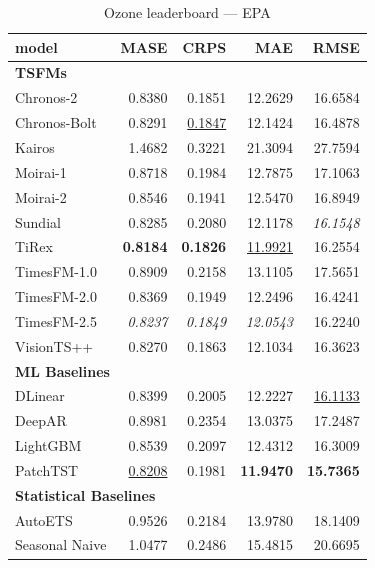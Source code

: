 \begin{table}[H]
\caption{Ozone leaderboard --- EPA}
\centering
\begin{small}
\begin{tabular}{lrrrr}
\toprule
model & MASE & CRPS & MAE & RMSE \\
\midrule
\multicolumn{5}{l}{\textbf{TSFMs}} \\
Chronos-2 & 0.8380 & 0.1851 & 12.2629 & 16.6584 \\
Chronos-Bolt & 0.8291 & \underline{0.1847} & 12.1424 & 16.4878 \\
Kairos & 1.4682 & 0.3221 & 21.3094 & 27.7594 \\
Moirai-1 & 0.8718 & 0.1984 & 12.7875 & 17.1063 \\
Moirai-2 & 0.8546 & 0.1941 & 12.5470 & 16.8949 \\
Sundial & 0.8285 & 0.2080 & 12.1178 & \textit{16.1548} \\
TiRex & \textbf{0.8184} & \textbf{0.1826} & \underline{11.9921} & 16.2554 \\
TimesFM-1.0 & 0.8909 & 0.2158 & 13.1105 & 17.5651 \\
TimesFM-2.0 & 0.8369 & 0.1949 & 12.2496 & 16.4241 \\
TimesFM-2.5 & \textit{0.8237} & \textit{0.1849} & \textit{12.0543} & 16.2240 \\
VisionTS++ & 0.8270 & 0.1863 & 12.1034 & 16.3623 \\
\midrule
\multicolumn{5}{l}{\textbf{ML Baselines}} \\
DLinear & 0.8399 & 0.2005 & 12.2227 & \underline{16.1133} \\
DeepAR & 0.8981 & 0.2354 & 13.0375 & 17.2487 \\
LightGBM & 0.8539 & 0.2097 & 12.4312 & 16.3009 \\
PatchTST & \underline{0.8208} & 0.1981 & \textbf{11.9470} & \textbf{15.7365} \\
\midrule
\multicolumn{5}{l}{\textbf{Statistical Baselines}} \\
AutoETS & 0.9526 & 0.2184 & 13.9780 & 18.1409 \\
Seasonal Naive & 1.0477 & 0.2486 & 15.4815 & 20.6695 \\
\bottomrule
\end{tabular}
\end{small}
\end{table}